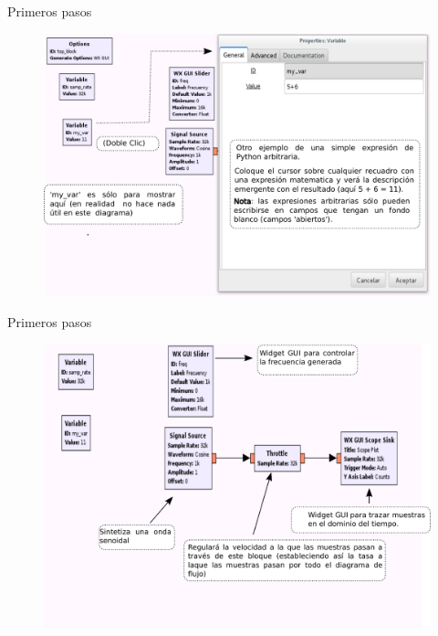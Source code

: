 \begin{frame}{Primeros pasos}
\begin{figure}[H]
\vspace{-3mm}
\centering
\includegraphics[width=.9\textwidth]{lab1/pdf/lab1_10.pdf}
\end{figure}
\end{frame}

\begin{frame}{Primeros pasos}
\begin{figure}[H]
\vspace{-3mm}
\centering
\includegraphics[width=\textwidth]{lab1/pdf/lab1_11.pdf}
\end{figure}
\end{frame}

